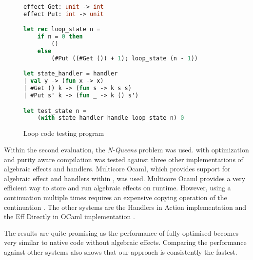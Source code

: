 \begin{figure}
\caption{Loop code testing program}
\label{lst:loop}
\begin{lstlisting}[language=Caml]
effect Get: unit -> int
effect Put: int -> unit

let rec loop_state n =
    if n = 0 then
        ()
    else
        (#Put ((#Get ()) + 1); loop_state (n - 1))

let state_handler = handler
| val y -> (fun x -> x)
| #Get () k -> (fun s -> k s s)
| #Put s' k -> (fun _ -> k () s')

let test_state n =
    (with state_handler handle loop_state n) 0
\end{lstlisting}
\end{figure}

Within the second evaluation, the \textit{N-Queens} problem was used. \eff with optimization and purity aware compilation was tested against three other implementations of algebraic effects and handlers. Multicore Ocaml, which provides support for algebraic effect and handlers within \ocaml, was used. Multicore Ocaml provides a very efficient way to store and run algebraic effects on runtime. However, using a continuation multiple times requires an expensive copying operation of the continuation \cite{ocaml}. The other systems are the Handlers in Action implementation \cite{kammar} and the Eff Directly in OCaml implementation \cite{eff2ocaml}. 

The results are quite promising as the performance of fully optimised \eff becomes very similar to native code without algebraic effects. Comparing the performance against other systems also shows that our approach is consistently the fastest. 

